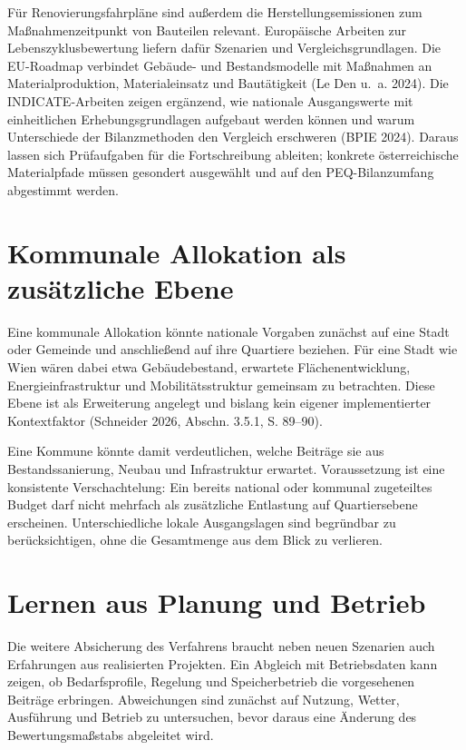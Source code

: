 \documentclass[
  ngerman,
  a4paper,
  DIV=11]{scrreprt}
\begin{document}
Für Renovierungsfahrpläne sind außerdem die Herstellungsemissionen zum
Maßnahmenzeitpunkt von Bauteilen relevant. Europäische Arbeiten zur
Lebenszyklusbewertung liefern dafür Szenarien und Vergleichsgrundlagen.
Die EU-Roadmap verbindet Gebäude- und Bestandsmodelle mit Maßnahmen an
Materialproduktion, Materialeinsatz und Bautätigkeit (Le Den u.~a.
2024). Die INDICATE-Arbeiten zeigen ergänzend, wie nationale
Ausgangswerte mit einheitlichen Erhebungsgrundlagen aufgebaut werden
können und warum Unterschiede der Bilanzmethoden den Vergleich
erschweren (BPIE 2024). Daraus lassen sich Prüfaufgaben für die
Fortschreibung ableiten; konkrete österreichische Materialpfade müssen
gesondert ausgewählt und auf den PEQ-Bilanzumfang abgestimmt werden.

\section{Kommunale Allokation als zusätzliche
Ebene}\label{kommunale-allokation-als-zusuxe4tzliche-ebene}

Eine kommunale Allokation könnte nationale Vorgaben zunächst auf eine
Stadt oder Gemeinde und anschließend auf ihre Quartiere beziehen. Für
eine Stadt wie Wien wären dabei etwa Gebäudebestand, erwartete
Flächenentwicklung, Energieinfrastruktur und Mobilitätsstruktur
gemeinsam zu betrachten. Diese Ebene ist als Erweiterung angelegt und
bislang kein eigener implementierter Kontextfaktor (Schneider 2026,
Abschn. 3.5.1, S. 89--90).

Eine Kommune könnte damit verdeutlichen, welche Beiträge sie aus
Bestandssanierung, Neubau und Infrastruktur erwartet. Voraussetzung ist
eine konsistente Verschachtelung: Ein bereits national oder kommunal
zugeteiltes Budget darf nicht mehrfach als zusätzliche Entlastung auf
Quartiersebene erscheinen. Unterschiedliche lokale Ausgangslagen sind
begründbar zu berücksichtigen, ohne die Gesamtmenge aus dem Blick zu
verlieren.

\section{Lernen aus Planung und
Betrieb}\label{lernen-aus-planung-und-betrieb}

Die weitere Absicherung des Verfahrens braucht neben neuen Szenarien
auch Erfahrungen aus realisierten Projekten. Ein Abgleich mit
Betriebsdaten kann zeigen, ob Bedarfsprofile, Regelung und
Speicherbetrieb die vorgesehenen Beiträge erbringen. Abweichungen sind
zunächst auf Nutzung, Wetter, Ausführung und Betrieb zu untersuchen,
bevor daraus eine Änderung des Bewertungsmaßstabs abgeleitet wird.
\end{document}
